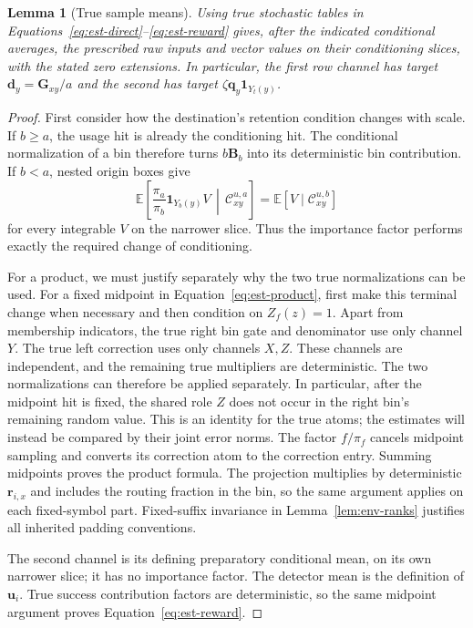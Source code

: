 \documentclass[11pt]{article}
\numberwithin{equation}{section}
\newtheorem{lemma}[theorem]{Lemma}
\theoremstyle{definition}
\theoremstyle{remark}
\begin{document}
\begin{lemma}[True sample means]\label{lem:est-true-means}
Using true stochastic tables in
Equations~\eqref{eq:est-direct}--\eqref{eq:est-reward} gives, after the
indicated conditional averages, the prescribed raw inputs and vector
values on their conditioning slices, with the stated zero extensions.
In particular, the first row channel has target
${\mathbf{d}}_y={\mathbf{G}}_{xy}/a$ and the second has target $\zeta {\mathbf{q}}_y\mathbf1_{Y_t(y)}$.
\end{lemma}
\begin{proof}
First consider how the destination's retention condition changes with scale. If $b\ge a$, the usage hit is already the conditioning hit.  The
conditional normalization of a bin therefore turns $b{\mathbf{B}}_b$ into
its deterministic bin contribution.  If $b<a$, nested origin boxes give
\[
 \mathbb E\left[\frac{\pi_a}{\pi_b}\mathbf1_{Y_b(y)}V
                   \,\middle|\,\mathcal C_{xy}^{u,a}\right]
   =\mathbb E[V\mid\mathcal C_{xy}^{u,b}]
\]
for every integrable $V$ on the narrower slice.  Thus the importance factor
performs exactly the required change of conditioning.

For a product, we must justify separately why the two true normalizations can be used. For a fixed midpoint in Equation~\eqref{eq:est-product}, first make this
terminal change when necessary and then condition on $Z_f(z)=1$.
Apart from membership indicators, the true right bin gate and denominator
use only channel $Y$.  The true left correction uses only channels $X,Z$.
These channels are independent, and the remaining true multipliers are
deterministic.  The two normalizations can therefore be applied separately.
In particular, after the midpoint hit is fixed, the shared role $Z$
does not occur in the right bin's remaining random value.  This is an
identity for the true atoms; the estimates will instead be compared by
their joint error norms.
The factor $f/\pi_f$ cancels midpoint sampling and converts its correction
atom to the correction entry.  Summing midpoints proves the product
formula.  The projection multiplies by deterministic ${\mathbf{r}}_{i,x}$ and includes
the routing fraction in the bin, so the same argument applies on each
fixed-symbol part.  Fixed-suffix invariance in Lemma~\ref{lem:env-ranks}
justifies all inherited padding conventions.

The second channel is its defining preparatory conditional mean, on its
own narrower slice; it has no importance factor.  The detector mean is
the definition of ${\mathbf{u}}_i$.  True success contribution factors are deterministic, so the
same midpoint argument proves Equation~\eqref{eq:est-reward}.
\end{proof}
\end{document}

